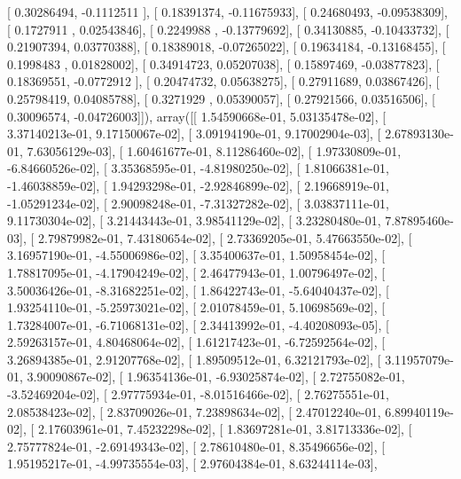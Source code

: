 \documentclass{article}
\begin{document}
       [ 0.30286494, -0.1112511 ],
       [ 0.18391374, -0.11675933],
       [ 0.24680493, -0.09538309],
       [ 0.1727911 ,  0.02543846],
       [ 0.2249988 , -0.13779692],
       [ 0.34130885, -0.10433732],
       [ 0.21907394,  0.03770388],
       [ 0.18389018, -0.07265022],
       [ 0.19634184, -0.13168455],
       [ 0.1998483 ,  0.01828002],
       [ 0.34914723,  0.05207038],
       [ 0.15897469, -0.03877823],
       [ 0.18369551, -0.0772912 ],
       [ 0.20474732,  0.05638275],
       [ 0.27911689,  0.03867426],
       [ 0.25798419,  0.04085788],
       [ 0.3271929 ,  0.05390057],
       [ 0.27921566,  0.03516506],
       [ 0.30096574, -0.04726003]]), array([[  1.54590668e-01,   5.03135478e-02],
       [  3.37140213e-01,   9.17150067e-02],
       [  3.09194190e-01,   9.17002904e-03],
       [  2.67893130e-01,   7.63056129e-03],
       [  1.60461677e-01,   8.11286460e-02],
       [  1.97330809e-01,  -6.84660526e-02],
       [  3.35368595e-01,  -4.81980250e-02],
       [  1.81066381e-01,  -1.46038859e-02],
       [  1.94293298e-01,  -2.92846899e-02],
       [  2.19668919e-01,  -1.05291234e-02],
       [  2.90098248e-01,  -7.31327282e-02],
       [  3.03837111e-01,   9.11730304e-02],
       [  3.21443443e-01,   3.98541129e-02],
       [  3.23280480e-01,   7.87895460e-03],
       [  2.79879982e-01,   7.43180654e-02],
       [  2.73369205e-01,   5.47663550e-02],
       [  3.16957190e-01,  -4.55006986e-02],
       [  3.35400637e-01,   1.50958454e-02],
       [  1.78817095e-01,  -4.17904249e-02],
       [  2.46477943e-01,   1.00796497e-02],
       [  3.50036426e-01,  -8.31682251e-02],
       [  1.86422743e-01,  -5.64040437e-02],
       [  1.93254110e-01,  -5.25973021e-02],
       [  2.01078459e-01,   5.10698569e-02],
       [  1.73284007e-01,  -6.71068131e-02],
       [  2.34413992e-01,  -4.40208093e-05],
       [  2.59263157e-01,   4.80468064e-02],
       [  1.61217423e-01,  -6.72592564e-02],
       [  3.26894385e-01,   2.91207768e-02],
       [  1.89509512e-01,   6.32121793e-02],
       [  3.11957079e-01,   3.90090867e-02],
       [  1.96354136e-01,  -6.93025874e-02],
       [  2.72755082e-01,  -3.52469204e-02],
       [  2.97775934e-01,  -8.01516466e-02],
       [  2.76275551e-01,   2.08538423e-02],
       [  2.83709026e-01,   7.23898634e-02],
       [  2.47012240e-01,   6.89940119e-02],
       [  2.17603961e-01,   7.45232298e-02],
       [  1.83697281e-01,   3.81713336e-02],
       [  2.75777824e-01,  -2.69149343e-02],
       [  2.78610480e-01,   8.35496656e-02],
       [  1.95195217e-01,  -4.99735554e-03],
       [  2.97604384e-01,   8.63244114e-03],
\end{document}
